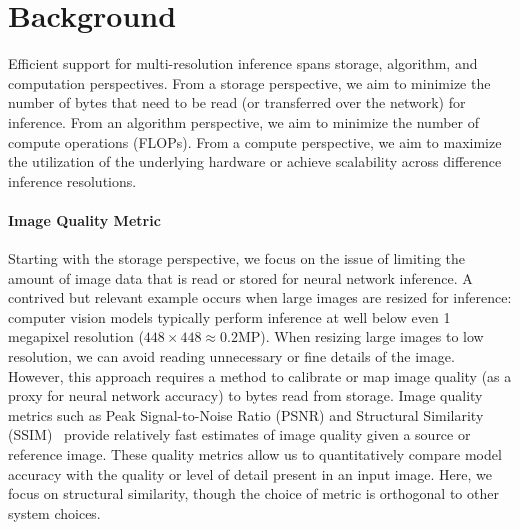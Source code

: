 \section{Background}
Efficient support for multi-resolution inference spans storage, algorithm, and computation perspectives.
From a storage perspective, we aim to minimize the number of bytes that need to be read (or transferred over the network) for inference.
From an algorithm perspective, we aim to minimize the number of compute operations (FLOPs).
From a compute perspective, we aim to maximize the utilization of the underlying hardware or achieve scalability across difference inference resolutions.
\paragraph{Image Quality Metric}
Starting with the storage perspective, we focus on the issue of limiting the amount of image data that is read or stored for neural network inference.
A contrived but relevant example occurs when large images are resized for inference: computer vision models typically perform inference at well below even 1 megapixel resolution ($448\times448 \approx 0.2 \text{MP}$).
When resizing large images to low resolution, we can avoid reading unnecessary or fine details of the image.
However, this approach requires a method to calibrate or map image quality (as a proxy for neural network accuracy) to bytes read from storage.
Image quality metrics such as Peak Signal-to-Noise Ratio (PSNR) and Structural Similarity (SSIM)~\cite{wang2004image} provide relatively fast estimates of image quality given a source or reference image.
These quality metrics allow us to quantitatively compare model accuracy with the quality or level of detail present in an input image.
Here, we focus on structural similarity, though the choice of metric is orthogonal to other system choices.

